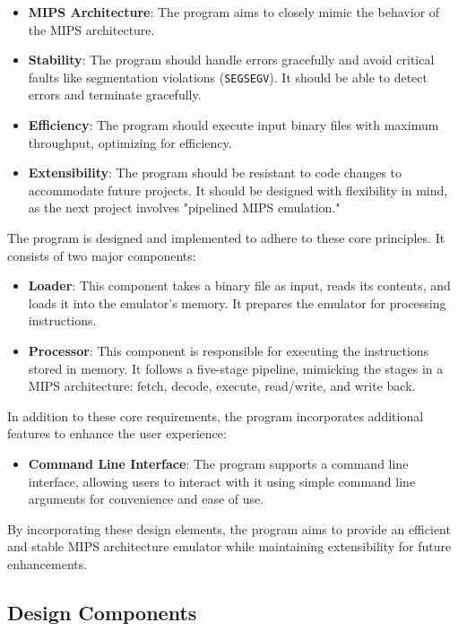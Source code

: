 \documentclass{homework}
\begin{document}
\begin{itemize}
\item \textbf{MIPS Architecture}: The program aims to closely mimic the behavior of the MIPS architecture.
\item \textbf{Stability}: The program should handle errors gracefully and avoid critical faults like segmentation violations (\texttt{SEGSEGV}). It should be able to detect errors and terminate gracefully.
\item \textbf{Efficiency}: The program should execute input binary files with maximum throughput, optimizing for efficiency.
\item \textbf{Extensibility}: The program should be resistant to code changes to accommodate future projects. It should be designed with flexibility in mind, as the next project involves "pipelined MIPS emulation."
\end{itemize}

The program is designed and implemented to adhere to these core principles. It consists of two major components:

\begin{itemize}
\item \textbf{Loader}: This component takes a binary file as input, reads its contents, and loads it into the emulator's memory. It prepares the emulator for processing instructions.
\item \textbf{Processor}: This component is responsible for executing the instructions stored in memory. It follows a five-stage pipeline, mimicking the stages in a MIPS architecture: fetch, decode, execute, read/write, and write back.
\end{itemize}

In addition to these core requirements, the program incorporates additional features to enhance the user experience:

\begin{itemize}
\item \textbf{Command Line Interface}: The program supports a command line interface, allowing users to interact with it using simple command line arguments for convenience and ease of use.
\end{itemize}

By incorporating these design elements, the program aims to provide an efficient and stable MIPS architecture emulator while maintaining extensibility for future enhancements.

\subsection{Design Components}
\end{document}
